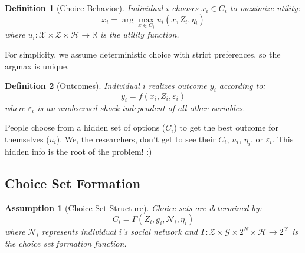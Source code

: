 \documentclass{article}
\newtheorem{definition}{Definition}
\newtheorem{assumption}{Assumption}
\newcommand{\R}{\mathbb{R}}
\newcommand{\X}{\mathcal{X}}
\newcommand{\G}{\mathcal{G}}
\begin{document}
\begin{definition}[Choice Behavior]
Individual $i$ chooses $x_i \in C_i$ to maximize utility:
\begin{equation}
x_i = \arg\max_{x \in C_i} u_i(x, Z_i, \eta_i) %
\end{equation}
where $u_i: \X \times \mathcal{Z} \times \mathcal{H} \to \R$ is the utility function.
\end{definition}

For simplicity, we assume deterministic choice with strict preferences, so the argmax is unique.

\begin{definition}[Outcomes]
Individual $i$ realizes outcome $y_i$ according to:
\begin{equation}
y_i = f(x_i, Z_i, \varepsilon_i) %
\end{equation}
where $\varepsilon_i$ is an unobserved shock independent of all other variables.
\end{definition}

\begin{tcolorbox}[mycommentbox,title=key takeaway]
People choose from a hidden set of options ($C_i$) to get the best outcome for themselves ($u_i$). We, the researchers, don't get to see their $C_i$, $u_i$, $\eta_i$, or $\varepsilon_i$. This hidden info is the root of the problem! :)
\end{tcolorbox}




\subsection{Choice Set Formation}

\begin{assumption}[Choice Set Structure]
\label{ass:choiceset}
Choice sets are determined by:
\begin{equation}
C_i = \Gamma(Z_i, g_i, \mathcal{N}_i, \eta_i) %
\end{equation}
where $\mathcal{N}_i$ represents individual $i$'s social network and $\Gamma: \mathcal{Z} \times \G \times 2^N \times \mathcal{H} \to 2^\X$ is the choice set formation function.
\end{assumption}
\end{document}
